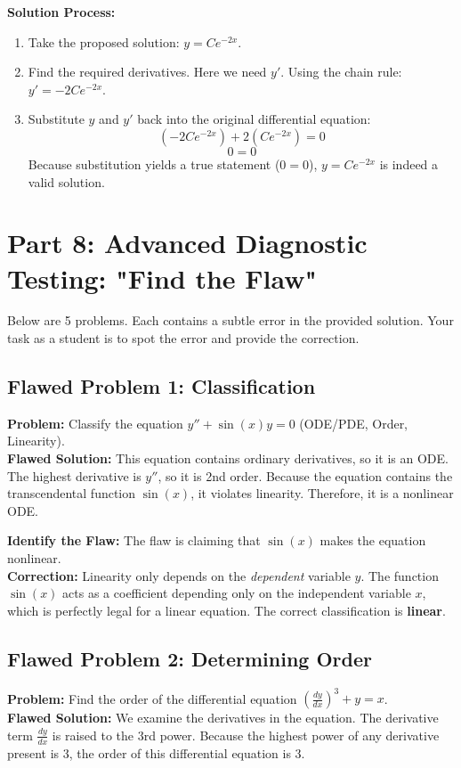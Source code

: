 \documentclass[11pt]{article}
\begin{document}
\noindent\textbf{Solution Process:}
\begin{enumerate}
    \item Take the proposed solution: $y = C e^{-2x}$.
    \item Find the required derivatives. Here we need $y'$. Using the chain rule: $y' = -2C e^{-2x}$.
    \item Substitute $y$ and $y'$ back into the original differential equation:
    \[ (-2C e^{-2x}) + 2(C e^{-2x}) = 0 \]
    \[ 0 = 0 \]
    Because substitution yields a true statement ($0=0$), $y = C e^{-2x}$ is indeed a valid solution.
\end{enumerate}

\section{Part 8: Advanced Diagnostic Testing: "Find the Flaw"}

Below are 5 problems. Each contains a subtle error in the provided solution. Your task as a student is to spot the error and provide the correction.

\subsection*{Flawed Problem 1: Classification}
\textbf{Problem:} Classify the equation $y'' + \sin(x) y = 0$ (ODE/PDE, Order, Linearity). \\
\textbf{Flawed Solution:} 
This equation contains ordinary derivatives, so it is an ODE. The highest derivative is $y''$, so it is 2nd order. Because the equation contains the transcendental function $\sin(x)$, it violates linearity. Therefore, it is a nonlinear ODE.

\textbf{Identify the Flaw:} The flaw is claiming that $\sin(x)$ makes the equation nonlinear. \\
\textbf{Correction:} Linearity only depends on the \textit{dependent} variable $y$. The function $\sin(x)$ acts as a coefficient depending only on the independent variable $x$, which is perfectly legal for a linear equation. The correct classification is \textbf{linear}.

\subsection*{Flawed Problem 2: Determining Order}
\textbf{Problem:} Find the order of the differential equation $\left(\frac{dy}{dx}\right)^3 + y = x$. \\
\textbf{Flawed Solution:} 
We examine the derivatives in the equation. The derivative term $\frac{dy}{dx}$ is raised to the 3rd power. Because the highest power of any derivative present is 3, the order of this differential equation is 3.
\end{document}

